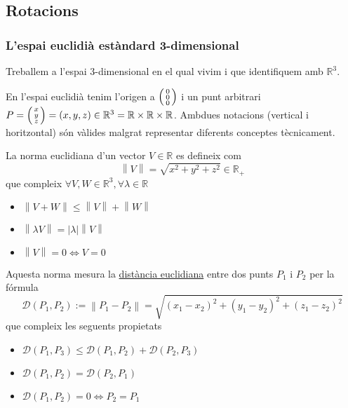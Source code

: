 \documentclass[../main.tex]{subfiles}
\begin{document}
	\subsection{Rotacions}
	\subsubsection{L'espai euclidià estàndard 3-dimensional}
	Treballem a l'espai 3-dimensional en el qual vivim i que identifiquem amb $\mathbb{R}^3$.
	\begin{notacio}
	    En l'espai euclidià tenim l'origen a $\begin{psmallmatrix}0\\0\\0\end{psmallmatrix}$ i un punt
	    arbitrari $P = \begin{psmallmatrix}x\\y\\z\end{psmallmatrix} = \left(x,y,z\right) \in \mathbb{R}^3 = \mathbb{R} \times \mathbb{R} \times \mathbb{R}$.
	    Ambdues notacions (vertical i horitzontal) són vàlides malgrat representar diferents conceptes
	    tècnicament.
	\end{notacio}
	\begin{definicio}
	    La norma euclidiana d'un vector $V \in \mathbb{R}$ es defineix com
		\begin{displaymath}
			\left\lVert V\right\rVert = \sqrt{x^2+y^2+z^2} \in \mathbb{R}_+
		\end{displaymath}
	    que compleix $\forall V, W \in \mathbb{R}^3, \forall \lambda \in \mathbb{R}$
	    \begin{itemize}
	        \item $\left\lVert V+W\right\rVert \leq \left\lVert V\right\rVert + \left\lVert W\right\rVert$
	        \item $\left\lVert \lambda V\right\rVert = \left\lvert \lambda\right\rvert\left\lVert V\right\rVert$
	        \item $\left\lVert V\right\rVert = 0\iff V = 0$
	    \end{itemize}
	    Aquesta norma mesura la \underline{distància euclidiana} entre dos punts $P_1$ i $P_2$ per la fórmula
	    \begin{displaymath}
			\mathcal{D}\left(P_1, P_2\right) := \left\lVert P_1 - P_2\right\rVert = \sqrt{\left(x_1-x_2\right)^2 + \left(y_1-y_2\right)^2 + \left(z_1-z_2\right)^2}
		\end{displaymath}
		que compleix les seguents propietats
	    \begin{itemize}
	        \item $\mathcal{D}\left(P_1, P_3\right) \leq \mathcal{D}\left(P_1, P_2\right) + \mathcal{D}\left(P_2, P_3\right)$
	        \item $\mathcal{D}\left(P_1, P_2\right) = \mathcal{D}\left(P_2, P_1\right)$
	        \item $\mathcal{D}\left(P_1, P_2\right) = 0 \iff P_2 = P_1$
	    \end{itemize}
	\end{definicio}
\end{document}
